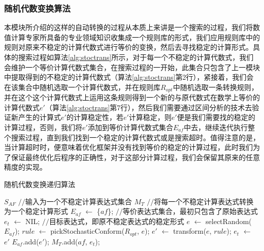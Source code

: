 \subsubsection{随机代数变换算法}
本模块所介绍的这样的自动转换的过程从本质上来讲是一个搜索的过程，我们将数值计算专家所具备的专业领域知识收集成一个规则库的形式，我们应用规则库中的规则对原来不稳定的计算代数式进行等价的变换，然后去寻找稳定的计算形式。具体的搜索过程如算法\ref{alg:stoctrans}所示，对于每一个不稳定的计算代数式，我们会维护一个等价计算代数式集合，在搜索过程的一开始，此集合只包含了上一模块中提取得到的不稳定的计算代数式（算法\ref{alg:stoctrans}第2行），紧接着，我们会在该集合中随机选取一个计算代数式，并在规则库$R_{opt}$中随机选取一条转换规则，并在这个这个计算代数式上运用这条规则得到一个新的与原代数式在数学上等价的计算代数式$e'$（算法\ref{alg:stoctrans}第7行），然后我们需要通过区间分析的技术去验证新产生的计算式$e'$的计算稳定性，若$e'$计算稳定，则$e'$便是我们需要找的稳定的计算过程，否则，我们将$e'$添加到等价计算代数式集合$E_{af}$中去，继续迭代执行整个搜索过程，直到我们找到一个稳定的计算代数式或是搜索超时。值得注意的是，当计算超时时，便意味着优化框架并没有找到等价的稳定的计算过程，此时我们为了保证最终优化后程序的正确性，对于这部分计算过程，我们会保留其原来的任意精度的实现。

\begin{algorithm}[tb]
  \caption{随机代数变换递归算法}
  \label{alg:stoctrans}
\begin{algorithmic}[1]
\REQUIRE $S_{AF}$ \hfill {{\footnotesize$//$}\small 输入为一个不稳定计算表达式集合}
\ENSURE $M_{T}$  {{\footnotesize$//$}\small 将每一个不稳定计算表达式转换为一个稳定计算形式} %
      \STATE $E_{af}$ $\leftarrow$ \{$af$\}; \hfill {{\footnotesize$//$}\small 等价表达式集合，最初只包含了原始表达式} \label{alg:stoctrans:eqset}
      \STATE $e_t$ $\leftarrow$ NIL; \hfill {{\footnotesize$//$}\small 目标表达式，即原不稳定表达式的稳定形式}
      \REPEAT
        \STATE $e$ $\leftarrow$ selectRandom($E_{af}$); \label{alg:stoctrans:expselect}%
        \STATE $rule$ $\leftarrow$ pickStochasticConform($R_{opt}$, $e$); \label{alg:stoctrans:rulepick}
        \STATE $e'$ $\leftarrow$ transform($e$, $rule$); \label{alg:stoctrans:applytrans}
         \label{alg:stoctrans:stableverify}
          \STATE $e_t$ $\leftarrow$ $e'$ \label{alg:stoctrans:getet}
        \ELSE
          \STATE $E_{af}$.add($e'$); \label{alg:stoctrans:putbackep}%
        \ENDIF
      \STATE $M_{T}$.add($af$, $e_t$); \label{alg:stoctrans:resultmap}
    \ENDFOR
\end{algorithmic}
\end{algorithm}

